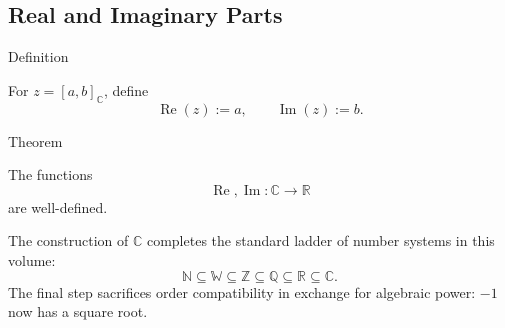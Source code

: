 \subsection*{Real and Imaginary Parts}

\begin{definitionbox}{Definition}
\begin{definition}
\label{def:real-and-imaginary-parts}
For \(z=[a,b]_{\mathbb{C}}\), define
\[
\operatorname{Re}(z):=a,
\qquad
\operatorname{Im}(z):=b.
\]
\end{definition}
\end{definitionbox}

\begin{theorembox}{Theorem}
\begin{theorem}
\label{thm:real-imaginary-parts-well-defined}
The functions
\[
\operatorname{Re},\operatorname{Im}:\mathbb{C}\to\mathbb{R}
\]
are well-defined.
\end{theorem}
\end{theorembox}

\begin{remark*}
The construction of \(\mathbb{C}\) completes the standard ladder of number
systems in this volume:
\[
\mathbb{N}\subseteq\mathbb{W}\subseteq\mathbb{Z}\subseteq
\mathbb{Q}\subseteq\mathbb{R}\subseteq\mathbb{C}.
\]
The final step sacrifices order compatibility in exchange for algebraic power:
\(-1\) now has a square root.
\end{remark*}
